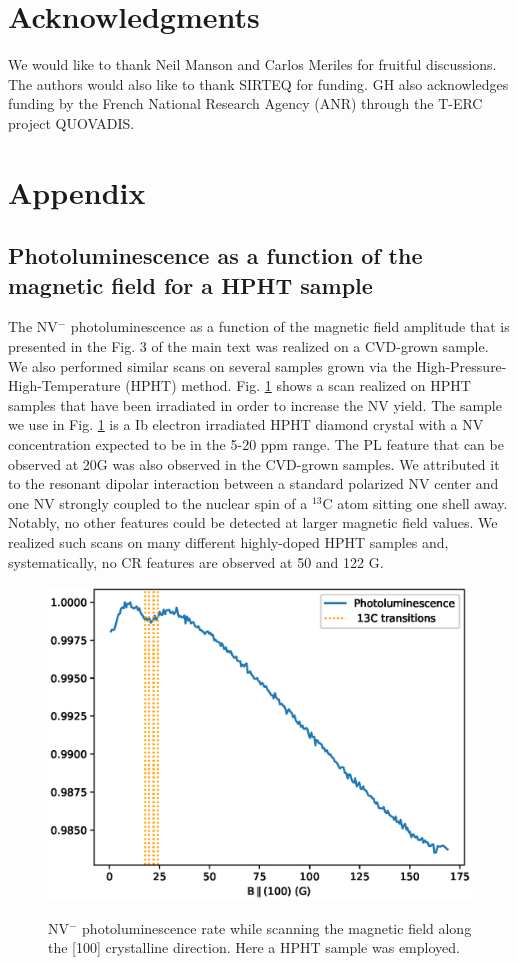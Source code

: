 \documentclass[9pt,twocolumn,twoside]{revtex4-1}
\begin{document}
\section*{Acknowledgments}
We would like to thank Neil Manson and Carlos Meriles for fruitful discussions. 
The authors would also like to thank SIRTEQ for funding. GH also acknowledges funding by the French National Research Agency (ANR) through the T-ERC project QUOVADIS. 

\section*{Appendix}
\subsection{Photoluminescence as a function of the magnetic field for a HPHT sample}

The NV$^-$ photoluminescence as a function of the magnetic field amplitude that is presented in the Fig. 3 of the main text was realized on a CVD-grown sample. 
We also performed similar scans on several samples grown via the High-Pressure-High-Temperature (HPHT) method. 
Fig. \ref{fig1SI} shows a scan realized on HPHT samples that have been irradiated in order to increase the NV yield. 
The sample we use in Fig. \ref{fig1SI} is a Ib electron irradiated HPHT diamond crystal with a NV concentration expected to be in the 5-20 ppm range.
The PL feature that can be observed at 20G was also observed in the CVD-grown samples. We attributed it to the resonant dipolar interaction between a standard polarized NV center and one NV strongly coupled to the nuclear spin of a $^{13}$C atom sitting one shell away.
Notably, no other features could be detected at larger magnetic field values. We realized such scans on many different highly-doped HPHT samples and, systematically, no CR features are observed at 50 and 122 G. 

 \begin{figure}[htbp]
\centering
{\includegraphics[width=\linewidth]{sumi4_13C.eps}}
\caption{NV$^-$ photoluminescence rate while scanning the magnetic field along the [100] crystalline direction. Here a HPHT sample was employed.}
\label{fig1SI}
\end{figure}
\end{document}
